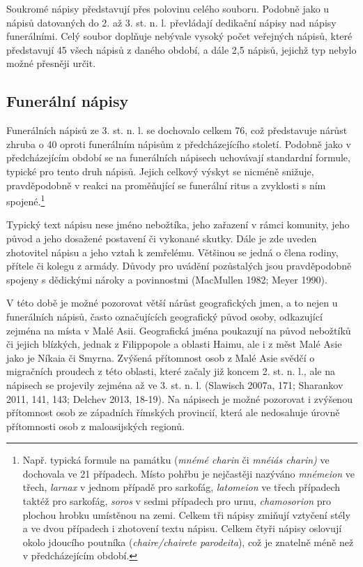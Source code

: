 Soukromé nápisy představují přes polovinu celého souboru. Podobně jako u nápisů datovaných do 2. až 3. st. n. l. převládají dedikační nápisy nad nápisy funerálními. Celý soubor doplňuje nebývale vysoký počet veřejných nápisů, které představují 45  všech nápisů z daného období, a dále 2,5  nápisů, jejichž typ nebylo možné přesněji určit.

\subsection[funerální-nápisy-15]{Funerální nápisy}

Funerálních nápisů ze 3. st. n. l. se dochovalo celkem 76, což představuje nárůst zhruba o 40  oproti funerálním nápisům z předcházejícího století. Podobně jako v předcházejícím období se na funerálních nápisech uchovávají standardní formule, typické pro tento druh nápisů. Jejich celkový výskyt se nicméně snižuje, pravděpodobně v reakci na proměňující se funerální ritus a zvyklosti s ním spojené.\footnote{Např. typická formule na památku ({\em mnémé charin} či {\em mnéiás charin)} ve dochovala ve 21 případech. Místo pohřbu je nejčastěji nazýváno {\em mnémeion} ve třech, {\em larnax} v jednom případě pro sarkofág, {\em latomeion} ve třech případech taktéž pro sarkofág, {\em soros} v sedmi případech pro urnu, {\em chamosorion} pro plochou hrobku umístěnou na zemi. Celkem tři nápisy zmiňují vztyčení stély a ve dvou případech i zhotovení textu nápisu. Celkem čtyři nápisy oslovují okolo jdoucího poutníka ({\em chaire/chairete parodeita}), což je znatelně méně než v předcházejícím období.}

Typický text nápisu nese jméno nebožtíka, jeho zařazení v rámci komunity, jeho původ a jeho dosažené postavení či vykonané skutky. Dále je zde uveden zhotovitel nápisu a jeho vztah k zemřelému. Většinou se jedná o člena rodiny, přítele či kolegu z armády. Důvody pro uvádění pozůstalých jsou pravděpodobně spojeny s dědickými nároky a povinnostmi (MacMullen 1982; Meyer 1990).

V této době je možné pozorovat větší nárůst geografických jmen, a to nejen u funerálních nápisů, často označujících geografický původ osoby, odkazující zejména na místa v Malé Asii. Geografická jména poukazují na původ nebožtíků či jejich blízkých, jednak z Filippopole a oblasti Haimu, ale i z měst Malé Asie jako je Níkaia či Smyrna. Zvýšená přítomnost osob z Malé Asie svědčí o migračních proudech z této oblasti, které začaly již koncem 2. st. n. l., ale na nápisech se projevily zejména až ve 3. st. n. l. (Slawisch 2007a, 171; Sharankov 2011, 141, 143; Delchev 2013, 18-19). Na nápisech je možné pozorovat i zvýšenou přítomnost osob ze západních římských provincií, která ale nedosahuje úrovně přítomnosti osob z maloasijských regionů.


